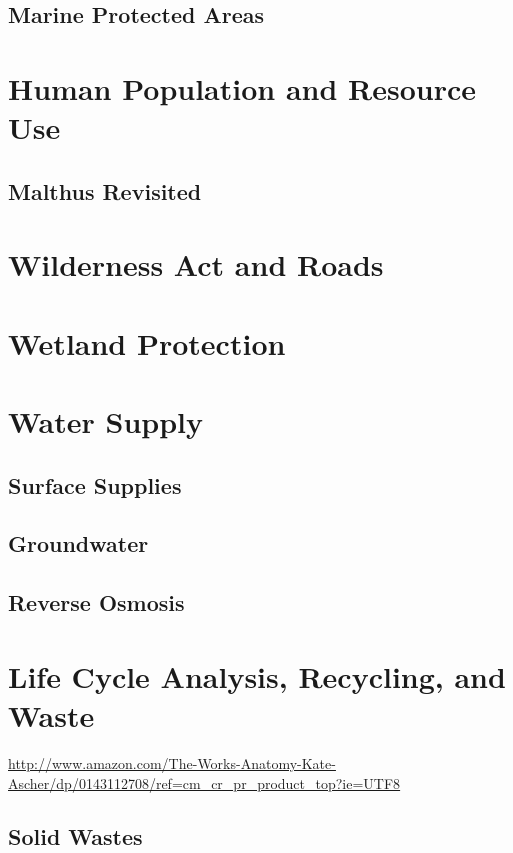 \documentclass{tufte-book}\usepackage[]{graphicx}\usepackage[]{xcolor}
\begin{document}
\section{Marine Protected Areas}

\chapter{Human Population and Resource Use}

\section{Malthus Revisited}


\chapter{Wilderness Act and Roads}

\chapter{Wetland Protection}

\chapter{Water Supply}

\section{Surface Supplies}

\section{Groundwater}

\section{Reverse Osmosis}



\chapter{Life Cycle Analysis, Recycling, and Waste}

\url{http://www.amazon.com/The-Works-Anatomy-Kate-Ascher/dp/0143112708/ref=cm_cr_pr_product_top?ie=UTF8}

\section{Solid Wastes}
\end{document}
